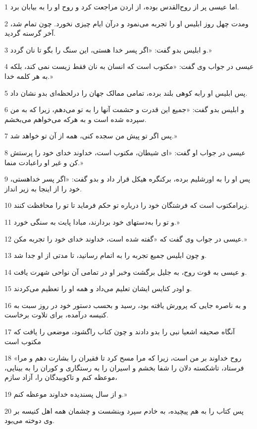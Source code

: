\par 1 اما عیسی پر از روح‌القدس بوده، از اردن مراجعت کرد و روح او را به بیابان برد.
\par 2 ومدت چهل روز ابلیس او را تجربه می‌نمود و درآن ایام چیزی نخورد. چون تمام شد، آخر گرسنه گردید.
\par 3 و ابلیس بدو گفت: «اگر پسر خدا هستی، این سنگ را بگو تا نان گردد.»
\par 4 عیسی در جواب وی گفت: «مکتوب است که انسان به نان فقط زیست نمی کند، بلکه به هر کلمه خدا.»
\par 5 پس ابلیس او رابه کوهی بلند برده، تمامی ممالک جهان را درلحظه‌ای بدو نشان داد.
\par 6 و ابلیس بدو گفت: «جمیع این قدرت و حشمت آنها را به تو می‌دهم، زیرا که به من سپرده شده است و به هر‌که می‌خواهم می‌بخشم.
\par 7 پس اگر تو پیش من سجده کنی، همه از آن تو خواهد شد.»
\par 8 عیسی در جواب او گفت: «ای شیطان، مکتوب است، خداوند خدای خود را پرستش کن و غیر او راعبادت منما.»
\par 9 پس او را به اورشلیم برده، برکنگره هیکل قرار داد و بدو گفت: «اگر پسر خداهستی، خود را از اینجا به زیر انداز.
\par 10 زیرامکتوب است که فرشتگان خود را درباره تو حکم فرماید تا تو را محافظت کنند.
\par 11 و تو را به‌دستهای خود بردارند، مبادا پایت به سنگی خورد.»
\par 12 عیسی در جواب وی گفت که «گفته شده است، خداوند خدای خود را تجربه مکن.»
\par 13 و چون ابلیس جمیع تجربه را به اتمام رسانید، تا مدتی از او جدا شد.
\par 14 و عیسی به قوت روح، به جلیل برگشت وخبر او در تمامی آن نواحی شهرت یافت.
\par 15 و اودر کنایس ایشان تعلیم می‌داد و همه او را تعظیم می‌کردند.
\par 16 و به ناصره جایی که پرورش یافته بود، رسید و بحسب دستور خود در روز سبت به کنیسه درآمده، برای تلاوت برخاست.
\par 17 آنگاه صحیفه اشعیا نبی را بدو دادند و چون کتاب راگشود، موضعی را یافت که مکتوب است
\par 18 «روح خداوند بر من است، زیرا که مرا مسح کرد تا فقیران را بشارت دهم و مرا فرستاد، تاشکسته دلان را شفا بخشم و اسیران را به رستگاری و کوران را به بینایی، موعظه کنم و تاکوبیدگان را، آزاد سازم،
\par 19 و از سال پسندیده خداوند موعظه کنم.»
\par 20 پس کتاب را به هم پیچیده، به خادم سپرد وبنشست و چشمان همه اهل کنیسه بر وی دوخته می‌بود.
